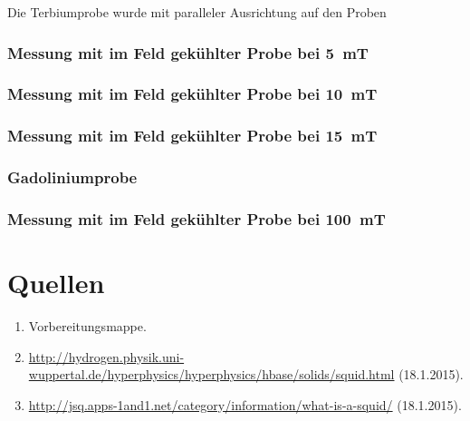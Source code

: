 \documentclass[a4paper,ngerman]{scrartcl}
\begin{document}
Die Terbiumprobe wurde mit paralleler Ausrichtung auf den Proben

\subsubsection*{Messung mit im Feld gekühlter Probe bei \SI{5}{mT}}

\subsubsection*{Messung mit im Feld gekühlter Probe bei \SI{10}{mT}}

\subsubsection*{Messung mit im Feld gekühlter Probe bei \SI{15}{mT}}



\subsubsection{Gadoliniumprobe}

\subsubsection*{Messung mit im Feld gekühlter Probe bei \SI{100}{mT}}







\section{Quellen}
\begin{enumerate}
\item Vorbereitungsmappe.\label{ref:mappe}
\item \url{http://hydrogen.physik.uni-wuppertal.de/hyperphysics/hyperphysics/hbase/solids/squid.html} (18.1.2015).\label{ref:wuppertal}
\item \url{http://jsq.apps-1and1.net/category/information/what-is-a-squid/} (18.1.2015).
\label{ref:jsq}
\end{enumerate}
\end{document}
